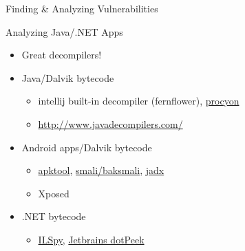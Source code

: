 {
\begin{frame}[plain]

  {\huge Finding \& Analyzing Vulnerabilities}

  \vspace{16em}

\end{frame}
}


\begin{frame}[fragile]
  {Analyzing Java/.NET Apps}

  \begin{itemize}
    \item Great decompilers!
    \item Java/Dalvik bytecode
      \begin{itemize}
        \item intellij built-in decompiler (fernflower),
          \href{https://bitbucket.org/mstrobel/procyon/}{procyon}
        \item \url{http://www.javadecompilers.com/}
      \end{itemize}
    \item Android apps/Dalvik bytecode
      \begin{itemize}
        \item \href{http://ibotpeaches.github.io/Apktool/}{apktool},
          \href{https://bitbucket.org/JesusFreke/smali/}{smali/baksmali},
          \href{https://github.com/skylot/jadx}{jadx}
        \item Xposed
      \end{itemize}
    \item .NET bytecode
      \begin{itemize}
        \item \href{http://ilspy.net/}{ILSpy}, \href{https://www.jetbrains.com/decompiler/}{Jetbrains dotPeek}
      \end{itemize}

  \end{itemize}

\end{frame}






